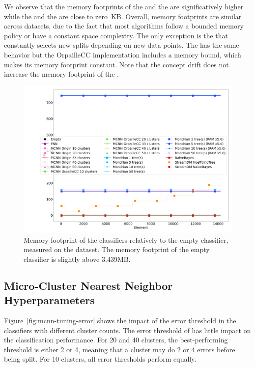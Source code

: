 We observe that the memory footprints of the \mondrianforest and the
\hoeffdingtree are significatively higher while the \mcnns and the \naivebayes are
close to zero~KB.
Overall, memory footprints are similar across datasets, due to the
fact that most algorithms follow a bounded memory policy or have a constant
space complexity.  The only exception is the \hoeffdingtree that constantly
selects new splits depending on new data points. The \mondrianforest has the
same behavior but the OrpailleCC implementation includes a memory bound, which
makes its memory footprint constant. Note that the concept drift does not
increase the memory footprint of the \hoeffdingtree.

\begin{figure}
	\includegraphics[width=\linewidth]{figures/results/banos_6_memory.png}
	\caption{Memory footprint of the classifiers relatively to the empty
	classifier, measured on the \banosdataset dataset. The memory footprint of the empty
	classifier is slightly above 3.439MB.}
	\label{fig:memory}
\end{figure}


\subsection{Micro-Cluster Nearest Neighbor Hyperparameters}

Figure~\ref{fig:mcnn-tuning-error} shows the impact of the error threshold
in the \mcnn classifiers with different cluster counts. The error
threshold of \mcnn has little impact on the classification performance. For
20 and 40 clusters, the best-performing threshold is either 2 or 4, meaning
that a cluster may do 2 or 4 errors before being split. For 10 clusters,
all error thresholds perform equally.

